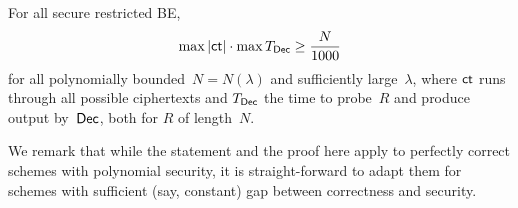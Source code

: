 \begin{theorem}\label{thm:lower-bound}
For all secure restricted BE,
\begin{align*}
\max{|\ct|}\cdot\max{\TDec}\geq\frac{N}{1000}
\end{align*}
for all polynomially bounded~${N=N(\lambda)}$ and sufficiently large~$\lambda$,
where $\ct$ runs through all possible ciphertexts and
$\TDec$ the time to probe~$R$ and produce output by~$\Dec$,
both for $R$ of length~$N$.
\end{theorem}

\noindent
We remark that while the statement and the proof here apply to perfectly correct schemes with polynomial security, it is straight-forward to adapt them for schemes with sufficient (say, constant) gap between correctness and security.
